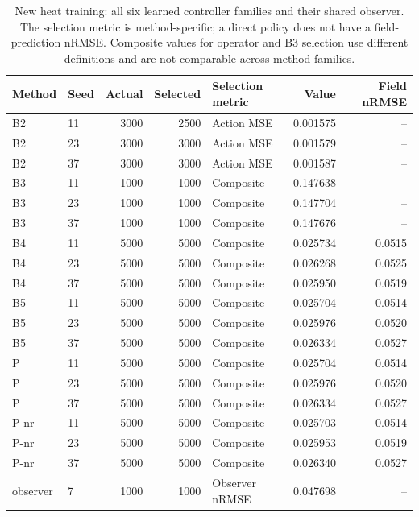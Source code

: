 \begin{table}[ht]
\centering\small
\caption{New heat training: all six learned controller families and their shared observer. The selection metric is method-specific; a direct policy does not have a field-prediction nRMSE. Composite values for operator and B3 selection use different definitions and are not comparable across method families.}\label{tab:new_heat_selection}
\begin{tabular}{@{}llrrlrr@{}}\toprule
Method & Seed & Actual & Selected & Selection metric & Value & Field nRMSE\\\midrule
B2 & 11 & 3000 & 2500 & Action MSE & 0.001575 & --\\
B2 & 23 & 3000 & 3000 & Action MSE & 0.001579 & --\\
B2 & 37 & 3000 & 3000 & Action MSE & 0.001587 & --\\
B3 & 11 & 1000 & 1000 & Composite & 0.147638 & --\\
B3 & 23 & 1000 & 1000 & Composite & 0.147704 & --\\
B3 & 37 & 1000 & 1000 & Composite & 0.147676 & --\\
B4 & 11 & 5000 & 5000 & Composite & 0.025734 & 0.0515\\
B4 & 23 & 5000 & 5000 & Composite & 0.026268 & 0.0525\\
B4 & 37 & 5000 & 5000 & Composite & 0.025950 & 0.0519\\
B5 & 11 & 5000 & 5000 & Composite & 0.025704 & 0.0514\\
B5 & 23 & 5000 & 5000 & Composite & 0.025976 & 0.0520\\
B5 & 37 & 5000 & 5000 & Composite & 0.026334 & 0.0527\\
P & 11 & 5000 & 5000 & Composite & 0.025704 & 0.0514\\
P & 23 & 5000 & 5000 & Composite & 0.025976 & 0.0520\\
P & 37 & 5000 & 5000 & Composite & 0.026334 & 0.0527\\
P-nr & 11 & 5000 & 5000 & Composite & 0.025703 & 0.0514\\
P-nr & 23 & 5000 & 5000 & Composite & 0.025953 & 0.0519\\
P-nr & 37 & 5000 & 5000 & Composite & 0.026340 & 0.0527\\
observer & 7 & 1000 & 1000 & Observer nRMSE & 0.047698 & --\\
\bottomrule\end{tabular}
\end{table}
